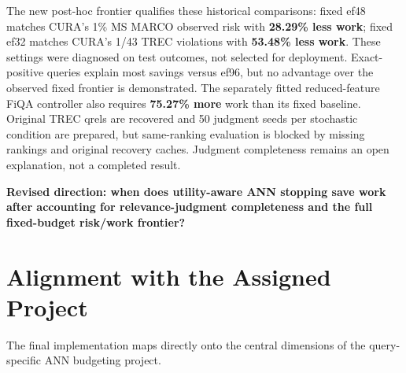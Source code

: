 \documentclass[10pt,twocolumn]{article}
\begin{document}
The new post-hoc frontier qualifies these historical comparisons: fixed ef48 matches CURA's 1\% MS MARCO observed risk with \textbf{28.29\% less work}; fixed ef32 matches CURA's 1/43 TREC violations with \textbf{53.48\% less work}. These settings were diagnosed on test outcomes, not selected for deployment. Exact-positive queries explain most savings versus ef96, but no advantage over the observed fixed frontier is demonstrated. The separately fitted reduced-feature FiQA controller also requires \textbf{75.27\% more} work than its fixed baseline. Original TREC qrels are recovered and 50 judgment seeds per stochastic condition are prepared, but same-ranking evaluation is blocked by missing rankings and original recovery caches. Judgment completeness remains an open explanation, not a completed result.

\begin{tcolorbox}[colback=CuraLight,colframe=CuraGreen,boxrule=0.8pt,arc=3pt,left=5pt,right=5pt,top=4pt,bottom=4pt]
\centering\small
\textbf{Revised direction: when does utility-aware ANN stopping save work after accounting for relevance-judgment completeness and the full fixed-budget risk/work frontier?}
\end{tcolorbox}

\appendix
\section{Alignment with the Assigned Project}
The final implementation maps directly onto the central dimensions of the query-specific ANN budgeting project.
\end{document}
